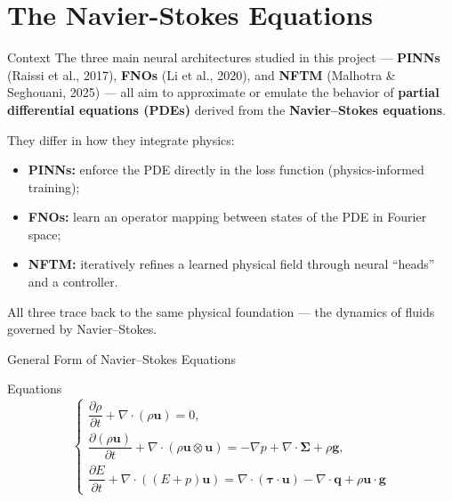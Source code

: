 \section{The Navier-Stokes Equations}

\begin{secframe}
\small

\vspace{0.6em}

\begin{block}{Context}
The three main neural architectures studied in this project —  
\textbf{PINNs} (Raissi et al., 2017), \textbf{FNOs} (Li et al., 2020),  
and \textbf{NFTM} (Malhotra \& Seghouani, 2025) —  
all aim to approximate or emulate the behavior of \textbf{partial differential equations (PDEs)} derived from the \textbf{Navier–Stokes equations}.  

They differ in how they integrate physics:
\begin{itemize}
  \item \textbf{PINNs:} enforce the PDE directly in the loss function (physics-informed training);
  \item \textbf{FNOs:} learn an operator mapping between states of the PDE in Fourier space;
  \item \textbf{NFTM:} iteratively refines a learned physical field through neural “heads” and a controller.
\end{itemize}
All three trace back to the same physical foundation — the dynamics of fluids governed by Navier–Stokes.
\end{block}
\end{secframe}




\begin{secframe}
\small
\textcolor{red_unipd}{\Large General Form of Navier--Stokes Equations}

\vspace{0.6em}

\begin{alertblock}{Equations}
\[
\begin{cases}
\dfrac{\partial \rho}{\partial t}
+ \nabla\!\cdot\!(\rho \mathbf{u}) = 0,\\[16pt]

\dfrac{\partial (\rho \mathbf{u})}{\partial t}
+ \nabla\!\cdot\!(\rho \mathbf{u} \otimes \mathbf{u})
= -\nabla p + \nabla\!\cdot\!\boldsymbol{\Sigma} + \rho \mathbf{g},\\[16pt]

\dfrac{\partial E}{\partial t}
+ \nabla\!\cdot\!((E+p)\mathbf{u})
= \nabla\!\cdot\!(\boldsymbol{\tau}\!\cdot\!\mathbf{u})
- \nabla\!\cdot\!\mathbf{q} + \rho \mathbf{u}\!\cdot\!\mathbf{g}
\end{cases}
\]
\end{alertblock}

\end{secframe}




